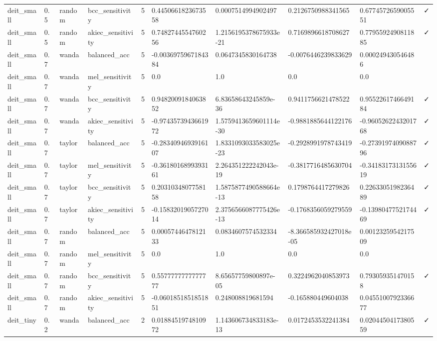 \begin{table}[t]
\begin{tabular}{llllllllll}
deit\_small & 0.5 & random & bcc\_sensitivity & 5 & 0.4450661823673558 & 0.0007514994902497 & 0.2126750988341565 & 0.6774572659005551 & ✓ \\
deit\_small & 0.5 & random & akiec\_sensitivity & 5 & 0.7482744554760256 & 1.2156195378675933e-21 & 0.7169896618708627 & 0.7795592490811885 & ✓ \\
deit\_small & 0.7 & wanda & balanced\_acc & 5 & -0.0036975967184384 & 0.0647345830164738 & -0.0076446239833629 & 0.000249430546486 &   \\
deit\_small & 0.7 & wanda & mel\_sensitivity & 5 & 0.0 & 1.0 & 0.0 & 0.0 &   \\
deit\_small & 0.7 & wanda & bcc\_sensitivity & 5 & 0.9482009184063852 & 6.83658643245859e-36 & 0.9411756621478522 & 0.9552261746649184 & ✓ \\
deit\_small & 0.7 & wanda & akiec\_sensitivity & 5 & -0.9743573943661972 & 1.5759413659601114e-30 & -0.9881885644122176 & -0.9605262243201768 & ✓ \\
deit\_small & 0.7 & taylor & balanced\_acc & 5 & -0.2834094693916107 & 1.8331093033583025e-23 & -0.2928991978743419 & -0.2739197409088796 & ✓ \\
deit\_small & 0.7 & taylor & mel\_sensitivity & 5 & -0.3618016899393161 & 2.264351222242043e-19 & -0.3817716485630704 & -0.3418317313155619 & ✓ \\
deit\_small & 0.7 & taylor & bcc\_sensitivity & 5 & 0.2031034807758158 & 1.5875877490588664e-13 & 0.1798764417279826 & 0.2263305198236489 & ✓ \\
deit\_small & 0.7 & taylor & akiec\_sensitivity & 5 & -0.1583201905727014 & 2.3756566087775426e-13 & -0.1768356059279559 & -0.1398047752174469 & ✓ \\
deit\_small & 0.7 & random & balanced\_acc & 5 & 0.0005744647812133 & 0.0834607574532334 & -8.366585932427018e-05 & 0.0012325954217509 &   \\
deit\_small & 0.7 & random & mel\_sensitivity & 5 & 0.0 & 1.0 & 0.0 & 0.0 &   \\
deit\_small & 0.7 & random & bcc\_sensitivity & 5 & 0.5577777777777777 & 8.65657759800897e-05 & 0.3224962040853973 & 0.793059351470158 & ✓ \\
deit\_small & 0.7 & random & akiec\_sensitivity & 5 & -0.0601851851851851 & 0.248008819681594 & -0.165880449604038 & 0.0455100792336677 &   \\
deit\_tiny & 0.2 & wanda & balanced\_acc & 2 & 0.0188451974810972 & 1.143606734833183e-13 & 0.0172453532241384 & 0.0204450417380559 & ✓ \\

\end{tabular}
\end{table}
